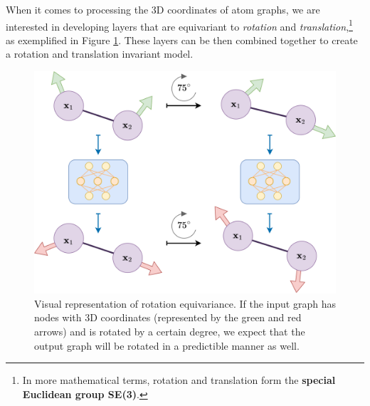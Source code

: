 
When it comes to processing the 3D coordinates of atom graphs, we are interested in developing layers that are equivariant to \textit{rotation} and \textit{translation},\footnote{In more mathematical terms, rotation and translation form the \textbf{special Euclidean group SE(3)}.} as exemplified in Figure \ref{equivariance}. These layers can be then combined together to create a rotation and translation invariant model.

\begin{figure}
    \centering
    \includegraphics[scale=0.6]{figures/equivariance-2.png}
    \caption{Visual representation of rotation equivariance. If the input graph has nodes with 3D coordinates (represented by the green and red arrows) and is rotated by a certain degree, we expect that the output graph will be rotated in a predictible manner as well.}
    \label{equivariance}
\end{figure}

